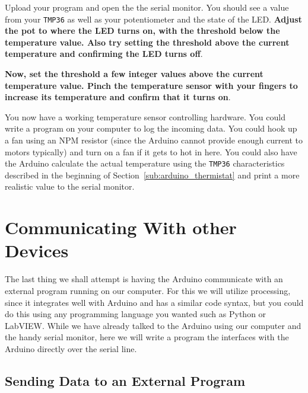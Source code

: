 \documentclass[11pt,a4paper]{article}
\begin{document}
Upload your program and open the the serial monitor.  You should see a value from your \texttt{TMP36} as well as your potentiometer and the state of the LED.  \textbf{Adjust the pot to where the LED turns on, with the threshold below the temperature value.  Also try setting the threshold above the current temperature and confirming the LED turns off}.

\textbf{Now, set the threshold a few integer values above the current temperature value.  Pinch the temperature sensor with your fingers to increase its temperature and confirm that it turns on}.  

You now have a working temperature sensor controlling hardware.  You could write a program on your computer to log the incoming data.  You could hook up a fan using an NPM resistor  (since the Arduino cannot provide enough current to motors typically) and turn on a fan if it gets to hot in here.  You could also have the Arduino calculate the actual temperature using the \texttt{TMP36} characteristics described in the beginning of Section~\ref{sub:arduino_thermistat} and print a more realistic value to the serial monitor.  




\section{Communicating With other Devices} %
\label{sec:communicating_with_other_devices}

The last thing we shall attempt is having the Arduino communicate with an external program running on our computer.  For this we will utilize processing, since it integrates well with Arduino and has a similar code syntax, but you could do this using any programming language you wanted such as Python or LabVIEW.  While we have already talked to the Arduino using our computer and the handy serial monitor, here we will write a program the interfaces with the Arduino directly over the serial line.

\subsection{Sending Data to an External Program} %
\label{sub:sending_data_to_an_external_program}
\end{document}
